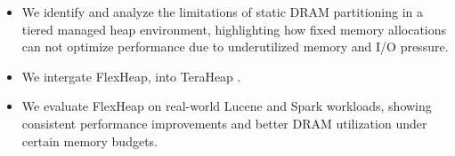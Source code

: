 \vspace{0.5em}
\begin{itemize}
\item We identify and analyze the limitations of static DRAM partitioning in a tiered managed heap 
  environment, highlighting how fixed memory allocations can not optimize performance 
  due to underutilized memory and I/O pressure.

\item We intergate FlexHeap, into TeraHeap \cite{melidonis_thesis, mairh_thesis}.

\item We evaluate FlexHeap on real-world Lucene and Spark workloads, showing consistent
  performance improvements and better DRAM utilization under certain memory budgets.

\end{itemize}
